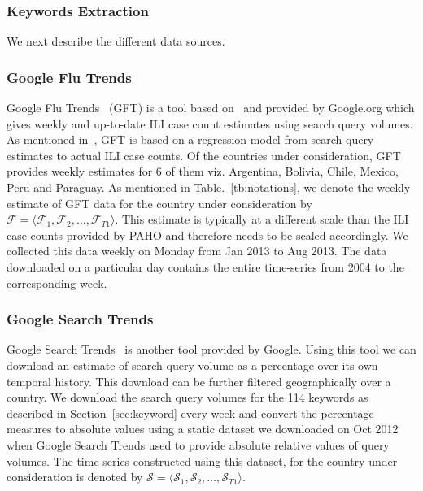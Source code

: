 \subsubsection{\label{sec:keyword} Keywords Extraction} 

We next describe the different data sources.  \subsubsection{Google Flu Trends}
Google Flu Trends~\cite{GFT:2013} (GFT) is a tool based
on~\cite{ginsberg2008detecting} and provided by Google.org which gives weekly
and up-to-date ILI case count estimates using search query volumes. As
mentioned in~\cite{ginsberg2008detecting}, GFT is based on a regression model
from search query estimates to actual ILI case counts.  Of the countries under
consideration, GFT provides weekly estimates for 6 of them viz.  Argentina,
Bolivia, Chile, Mexico, Peru and Paraguay. As mentioned in
Table.~\ref{tb:notations}, we denote the weekly estimate of GFT data for the
country under consideration by $\mathcal{F} = \langle \mathcal{F}_1,
\mathcal{F}_2, \dots, \mathcal{F}_{T1} \rangle$. This estimate is typically at
a different scale than the ILI case counts provided by PAHO and therefore needs
to be scaled accordingly.  We collected this data weekly on Monday from Jan
2013 to Aug 2013. The data downloaded on a particular day contains the entire
time-series from 2004 to the corresponding week.  
 

\subsubsection{Google Search Trends} Google Search Trends~\cite{GST:2013} is
another tool provided by Google. Using this tool we can download an estimate of
search query volume as a percentage over its own temporal history. This
download can be further filtered geographically over a country.  We download
the search query volumes for the 114 keywords as described in
Section~\ref{sec:keyword} every week and convert the percentage measures to
absolute values using a static dataset we downloaded on Oct 2012 when Google
Search Trends used to provide absolute relative values of query volumes. The
time series constructed using this dataset, for the country under consideration
is denoted by
$\mathcal{S} = \langle \mathcal{S}_1, \mathcal{S}_2, \dots, \mathcal{S}_{T1} \rangle$.

